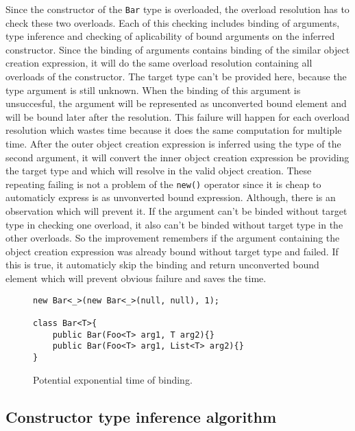 Since the constructor of the \texttt{Bar} type is overloaded, the overload resolution has to check these two overloads.
Each of this checking includes binding of arguments, type inference and checking of aplicability of bound arguments on the inferred constructor.
Since the binding of arguments contains binding of the similar object creation expression, it will do the same overload resolution containing all overloads of the constructor.
The target type can't be provided here, because the type argument is still unknown.
When the binding of this argument is unsuccesful, the argument will be represented as unconverted bound element and will be bound later after the resolution.
This failure will happen for each overload resolution which wastes time because it does the same computation for multiple time.
After the outer object creation expression is inferred using the type of the second argument, it will convert the inner object creation expression be providing the target type and which will resolve in the valid object creation.
These repeating failing is not a problem of the \texttt{new()} operator since it is cheap to automaticly express is as unvonverted bound expression.
Although, there is an observation which will prevent it.
If the argument can't be binded without target type in checking one overload, it also can't be binded without target type in the other overloads.
So the improvement remembers if the argument containing the object creation expression was already bound without target type and failed. 
If this is true, it automaticly skip the binding and return unconverted bound element which will prevent obvious failure and saves the time.  
\begin{figure}[h!]
\begin{lstlisting}[style=csharp, mathescape=true]
new Bar<_>(new Bar<_>(null, null), 1);

class Bar<T>{
    public Bar(Foo<T> arg1, T arg2){}
    public Bar(Foo<T> arg1, List<T> arg2){}
}
\end{lstlisting}
\caption{Potential exponential time of binding.}
\label{img61:exp}
\end{figure}

\subsection{Constructor type inference algorithm}

